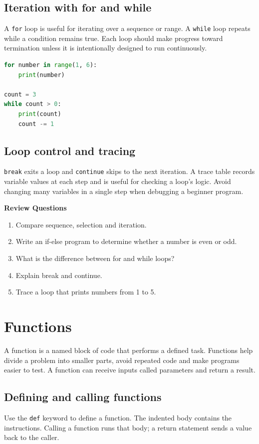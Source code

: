 \documentclass[11pt,openany,oneside]{book}
\newcommand{\reviewtitle}{\par\noindent\textbf{\color{Navy}Review Questions}\par}
\begin{document}
\section{Iteration with for and while}
A \texttt{for} loop is useful for iterating over a sequence or range. A \texttt{while} loop repeats while a condition remains true. Each loop should make progress toward termination unless it is intentionally designed to run continuously.

\begin{lstlisting}[style=webcode,language=Python]
for number in range(1, 6):
    print(number)

count = 3
while count > 0:
    print(count)
    count -= 1
\end{lstlisting}

\section{Loop control and tracing}
\texttt{break} exits a loop and \texttt{continue} skips to the next iteration. A trace table records variable values at each step and is useful for checking a loop's logic. Avoid changing many variables in a single step when debugging a beginner program.

\reviewtitle
\begin{enumerate}
\item Compare sequence, selection and iteration.
\item Write an if-else program to determine whether a number is even or odd.
\item What is the difference between for and while loops?
\item Explain break and continue.
\item Trace a loop that prints numbers from 1 to 5.
\end{enumerate}

\chapter{Functions}
A function is a named block of code that performs a defined task. Functions help divide a problem into smaller parts, avoid repeated code and make programs easier to test. A function can receive inputs called parameters and return a result.

\section{Defining and calling functions}
Use the \texttt{def} keyword to define a function. The indented body contains the instructions. Calling a function runs that body; a return statement sends a value back to the caller.
\end{document}
